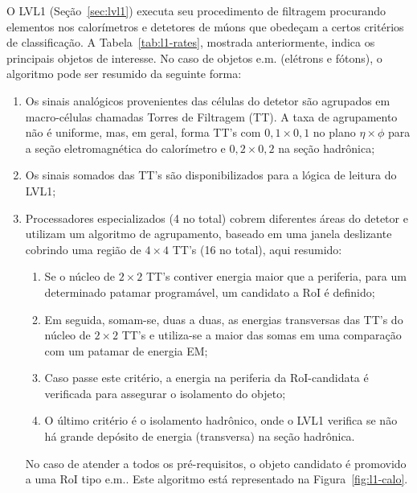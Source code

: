 O LVL1 (Seção~\ref{sec:lvl1}) executa seu procedimento de filtragem procurando
elementos nos calorímetros e detetores de múons que obedeçam a certos
critérios de classificação. A Tabela~\ref{tab:l1-rates}, mostrada
anteriormente, indica os principais objetos de interesse. No caso de objetos
e.m. (elétrons e fótons), o algoritmo pode ser resumido da seguinte forma:

\begin{enumerate}
\item Os sinais analógicos provenientes das células do detetor são agrupados
em macro-células chamadas Torres de Filtragem (TT). A taxa de agrupamento não
é uniforme, mas, em geral, forma TT's com $0,1\times0,1$ no plano
$\eta\times\phi$ para a seção eletromagnética do calorímetro e $0,2\times0,2$
na seção hadrônica;

\item Os sinais somados das TT's são disponibilizados para a
lógica de leitura do LVL1;

\item Processadores especializados (4 no total) cobrem diferentes áreas do
detetor e utilizam um algoritmo de agrupamento, baseado em uma janela
deslizante \cite{l1-tdr} cobrindo uma região de $4\times4$ TT's (16 no
total), aqui resumido:

\begin{enumerate}
\item Se o núcleo de $2\times2$ TT's contiver energia maior que a
periferia, para um determinado patamar programável, um candidato a RoI é
definido;

\item Em seguida, somam-se, duas a duas, as energias transversas das TT's do
núcleo de $2\times2$ TT's e utiliza-se a maior das somas em uma comparação com
um patamar de energia EM;

\item Caso passe este critério, a energia na periferia da RoI-candidata é
verificada para assegurar o isolamento do objeto; 

\item O último critério é o isolamento hadrônico, onde o LVL1 verifica se não
há grande depósito de energia (transversa) na seção hadrônica.
\end{enumerate}  

No caso de atender a todos os pré-requisitos, o objeto candidato é promovido a
uma RoI tipo e.m.. Este algoritmo está representado na
Figura~\ref{fig:l1-calo}.
\end{enumerate}


